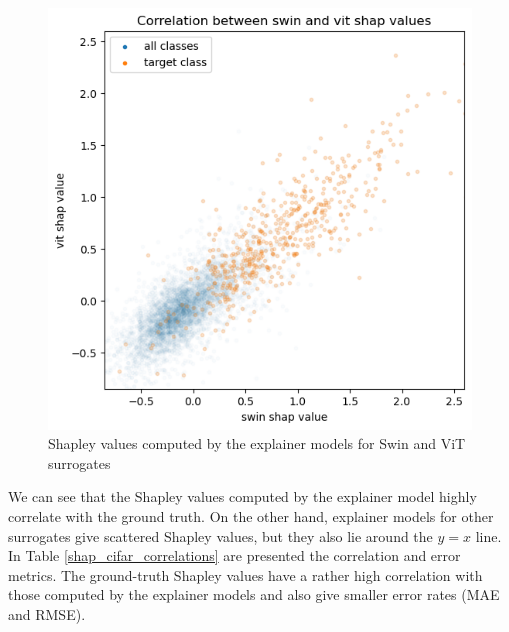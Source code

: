\documentclass[en]{pracamgr}
\begin{document}
\begin{figure}[H]
\centering
\includegraphics[scale=0.5]{./images/swin_vit_cifar.png}
\caption{Shapley values computed by the explainer models for Swin and ViT surrogates}
\label{swin_vit_cifar}
\end{figure}

We can see that the Shapley values computed by the explainer model highly correlate with the ground truth. On the other hand, explainer models for other surrogates give scattered Shapley values, but they also lie around the $y=x$ line. In Table \ref{shap_cifar_correlations} are presented the correlation and error metrics. The ground-truth Shapley values have a rather high correlation with those computed by the explainer models and also give smaller error rates (MAE and RMSE).
\end{document}
